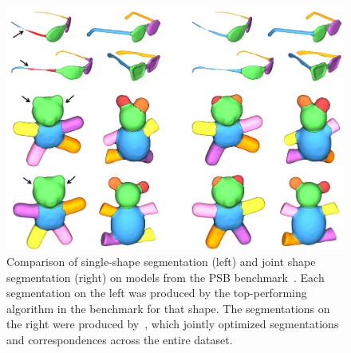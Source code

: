 \begin{figure}[t!]
\centering
    \includegraphics[width=1.0\columnwidth]{fig/img/huang_siga11_jss.png}
    \caption{Comparison of single-shape segmentation (left) and joint shape segmentation (right) on models from the PSB benchmark~\protect\cite{Chen:2009:BMS}. Each segmentation on the left was produced by the top-performing algorithm in the benchmark for that shape. The segmentations on the right were produced
by~\protect\cite{Huang:2011:JSS}, which jointly optimized segmentations and correspondences across the entire dataset.}
    \label{fig:huang_siga11_jss}
\end{figure}

